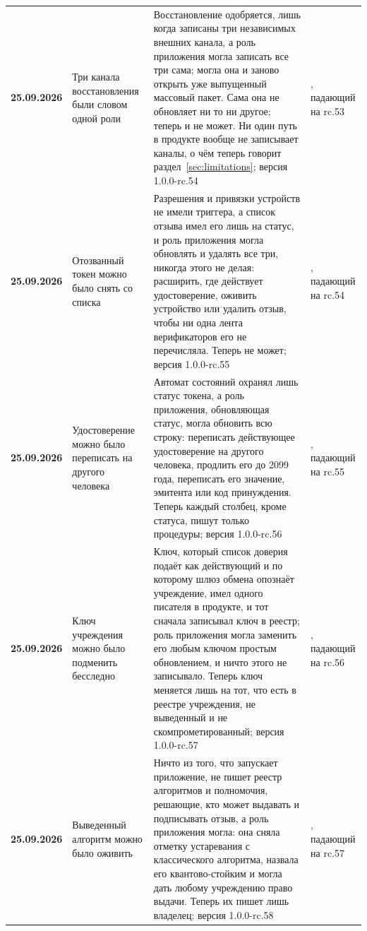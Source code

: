 {\begin{xltabular}{\textwidth}{>{\bfseries\hspace{0pt}}p{0.74in} >{\RaggedRight\arraybackslash\hspace{0pt}}X >{\RaggedRight\arraybackslash\hspace{0pt}}X >{\RaggedRight\arraybackslash\hspace{0pt}}p{1.6in}}
25.09.2026 & Три канала восстановления были словом одной роли & Восстановление одобряется, лишь когда записаны три независимых внешних канала, а роль приложения могла записать все три сама; могла она и заново открыть уже выпущенный массовый пакет. Сама она не обновляет ни то ни другое; теперь и не может. Ни один путь в продукте вообще не записывает каналы, о чём теперь говорит раздел~\ref{sec:limitations}; версия 1.0.0-rc.54 & , падающий на rc.53 \\
25.09.2026 & Отозванный токен можно было снять со списка & Разрешения и привязки устройств не имели триггера, а список отзыва имел его лишь на статус, и роль приложения могла обновлять и удалять все три, никогда этого не делая: расширить, где действует удостоверение, оживить устройство или удалить отзыв, чтобы ни одна лента верификаторов его не перечисляла. Теперь не может; версия 1.0.0-rc.55 & , падающий на rc.54 \\
25.09.2026 & Удостоверение можно было переписать на другого человека & Автомат состояний охранял лишь статус токена, а роль приложения, обновляющая статус, могла обновить всю строку: переписать действующее удостоверение на другого человека, продлить его до 2099 года, переписать его значение, эмитента или код принуждения. Теперь каждый столбец, кроме статуса, пишут только процедуры; версия 1.0.0-rc.56 & , падающий на rc.55 \\
25.09.2026 & Ключ учреждения можно было подменить бесследно & Ключ, который список доверия подаёт как действующий и по которому шлюз обмена опознаёт учреждение, имел одного писателя в продукте, и тот сначала записывал ключ в реестр; роль приложения могла заменить его любым ключом простым обновлением, и ничто этого не записывало. Теперь ключ меняется лишь на тот, что есть в реестре учреждения, не выведенный и не скомпрометированный; версия 1.0.0-rc.57 & , падающий на rc.56 \\
25.09.2026 & Выведенный алгоритм можно было оживить & Ничто из того, что запускает приложение, не пишет реестр алгоритмов и полномочия, решающие, кто может выдавать и подписывать отзыв, а роль приложения могла: она сняла отметку устаревания с классического алгоритма, назвала его квантово-стойким и могла дать любому учреждению право выдачи. Теперь их пишет лишь владелец; версия 1.0.0-rc.58 & , падающий на rc.57 \\

\end{xltabular}}
